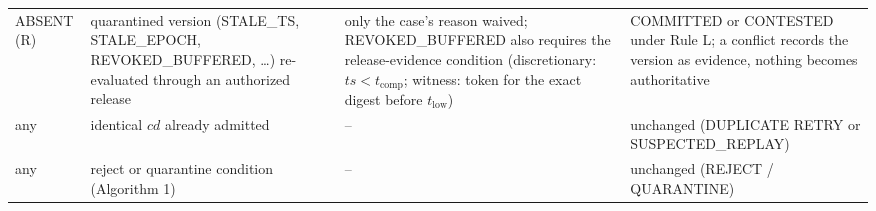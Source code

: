 \documentclass[10pt,a4paper]{article}
\begin{document}
\begin{table}[!htbp]
\begin{tabularx}{\linewidth}{@{}>{\raggedright\arraybackslash}p{1.95cm}>{\raggedright\arraybackslash}X>{\raggedright\arraybackslash}X>{\raggedright\arraybackslash}X@{}}
ABSENT (R) & quarantined version (STALE\_TS, STALE\_EPOCH, REVOKED\_BUFFERED, \ldots) re-evaluated through an authorized release & only the case's reason waived; REVOKED\_BUFFERED also requires the release-evidence condition (discretionary: $ts<t_\mathrm{comp}$; witness: token for the exact digest before $t_\mathrm{low}$) & COMMITTED or CONTESTED under Rule L; a conflict records the version as evidence, nothing becomes authoritative\\
any & identical $cd$ already admitted & -- & unchanged (DUPLICATE RETRY or SUSPECTED\_REPLAY)\\
any & reject or quarantine condition (Algorithm 1) & -- & unchanged (REJECT / QUARANTINE)\\
\bottomrule
\end{tabularx}
\end{table}
\end{document}
